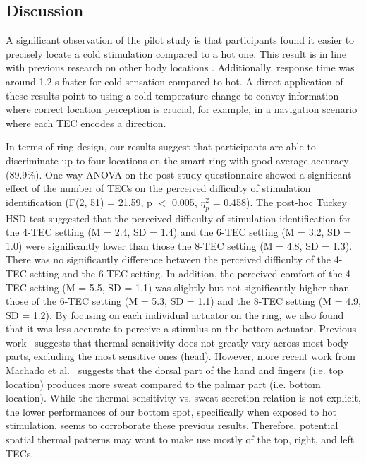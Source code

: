 \documentclass[preprint,12pt]{elsarticle}
\begin{document}
\subsection{Discussion}
A significant observation of the pilot study is that participants found it easier to precisely locate a cold stimulation compared to a hot one. This result is in line with previous research on other body locations \cite{10}. Additionally, response time was around 1.2 s faster for cold sensation compared to hot. A direct application of these results point to using a cold temperature change to convey information where correct location perception is crucial, for example, in a navigation scenario where each TEC encodes a direction.


In terms of ring design, our results suggest that participants are able to discriminate up to four locations on the smart ring with good average accuracy (89.9\%). One-way ANOVA on the post-study questionnaire showed a significant effect of the number of TECs on the perceived difficulty of stimulation identification (F(2, 51) = 21.59, p $<$ 0.005, $\eta_p^2$ = 0.458). The post-hoc Tuckey HSD test suggested that the perceived difficulty of stimulation identification for the 4-TEC setting (M = 2.4, SD = 1.4) and the 6-TEC setting (M = 3.2, SD = 1.0) were significantly lower than those the 8-TEC setting (M = 4.8, SD = 1.3). There was no significantly difference between the perceived difficulty of the 4-TEC setting and the 6-TEC setting. In addition, the perceived comfort of the 4-TEC setting (M = 5.5, SD = 1.1) was slightly but not significantly higher than those of the 6-TEC setting (M = 5.3, SD = 1.1) and the 8-TEC setting (M = 4.9, SD = 1.2). By focusing on each individual actuator on the ring, we also found that it was less accurate to perceive a stimulus on the bottom actuator.
Previous work~\cite{31} suggests that thermal sensitivity does not greatly vary across most body parts, excluding the most sensitive ones (head).
However, more recent work from Machado et al.~\cite{Machado2008} suggests that the dorsal part of the hand and fingers (i.e. top location) produces more sweat compared to the palmar part (i.e. bottom location).
While the thermal sensitivity vs. sweat secretion relation is not explicit, the lower performances of our bottom spot, specifically when exposed to hot stimulation, seems to corroborate these previous results.
Therefore, potential spatial thermal patterns may want to make use mostly of the top, right, and left TECs.
\end{document}
